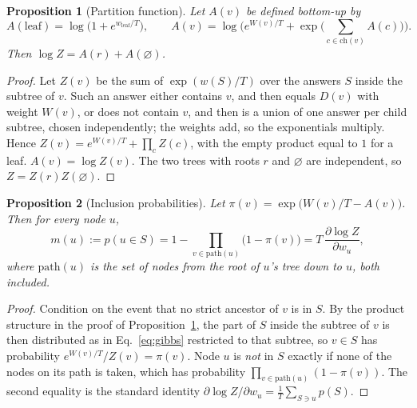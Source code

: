\documentclass[11pt,a4paper]{article}
\newtheorem{proposition}{Proposition}
\theoremstyle{definition}
\theoremstyle{remark}
\newcommand{\nul}{\varnothing}
\begin{document}
\begin{proposition}[Partition function]\label{prop:logz}
Let $A(v)$ be defined bottom-up by
\[
A(\text{leaf})=\log\big(1+e^{w_{\text{leaf}}/T}\big),\qquad
A(v)=\log\Big(e^{W(v)/T}+\exp\!\Big(\sum_{c\in\mathrm{ch}(v)}A(c)\Big)\Big).
\]
Then $\log Z=A(r)+A(\nul)$.
\end{proposition}
\begin{proof}
Let $Z(v)$ be the sum of $\exp(w(S)/T)$ over the answers $S$ inside the subtree of $v$. Such an answer either
contains $v$, and then equals $D(v)$ with weight $W(v)$, or does not contain $v$, and then is a union of one answer
per child subtree, chosen independently; the weights add, so the exponentials multiply. Hence
$Z(v)=e^{W(v)/T}+\prod_cZ(c)$, with the empty product equal to $1$ for a leaf. $A(v)=\log Z(v)$. The two trees with
roots $r$ and $\nul$ are independent, so $Z=Z(r)Z(\nul)$.
\end{proof}

\begin{proposition}[Inclusion probabilities]\label{prop:marg}
Let $\pi(v)=\exp\big(W(v)/T-A(v)\big)$. Then for every node $u$,
\[
m(u):=p(u\in S)=1-\prod_{v\in\mathrm{path}(u)}\big(1-\pi(v)\big)=T\,\frac{\partial\log Z}{\partial w_u},
\]
where $\mathrm{path}(u)$ is the set of nodes from the root of $u$'s tree down to $u$, both included.
\end{proposition}
\begin{proof}
Condition on the event that no strict ancestor of $v$ is in $S$. By the product structure in the proof of
Proposition~\ref{prop:logz}, the part of $S$ inside the subtree of $v$ is then distributed as in
Eq.~\eqref{eq:gibbs} restricted to that subtree, so $v\in S$ has probability $e^{W(v)/T}/Z(v)=\pi(v)$. Node $u$ is
\emph{not} in $S$ exactly if none of the nodes on its path is taken, which has probability
$\prod_{v\in\mathrm{path}(u)}(1-\pi(v))$. The second equality is the standard identity
$\partial\log Z/\partial w_u=\frac1T\sum_{S\ni u}p(S)$.
\end{proof}
\end{document}
